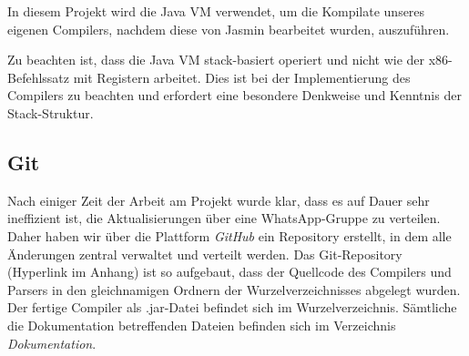 In diesem Projekt wird die Java VM verwendet, um die Kompilate unseres eigenen Compilers, nachdem diese von Jasmin bearbeitet wurden, auszuführen.

Zu beachten ist, dass die Java VM stack-basiert operiert und nicht wie der x86-Befehlssatz mit Registern arbeitet. Dies ist bei der Implementierung des Compilers zu beachten und erfordert eine besondere Denkweise und Kenntnis der Stack-Struktur.

\subsection{Git}
Nach einiger Zeit der Arbeit am Projekt wurde klar, dass es auf Dauer sehr ineffizient ist, die Aktualisierungen über eine WhatsApp-Gruppe zu verteilen. Daher haben wir über die Plattform \textit{GitHub} ein Repository erstellt, in dem alle Änderungen zentral verwaltet und verteilt werden.
Das Git-Repository (Hyperlink im Anhang) ist so aufgebaut, dass der Quellcode des Compilers und Parsers in den gleichnamigen Ordnern der Wurzelverzeichnisses abgelegt wurden. Der fertige Compiler als .jar-Datei befindet sich im Wurzelverzeichnis. Sämtliche die Dokumentation betreffenden Dateien befinden sich im Verzeichnis \textit{Dokumentation}.